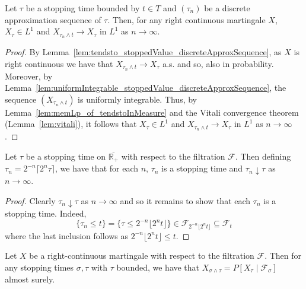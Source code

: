 \begin{lemma}\label{lem:tendsto_eLpNorm_stoppedValue_discreteApproxSequence}
  \leanok
  Let \(\tau\) be a stopping time bounded by \(t \in T\) and \((\tau_n)\) be a discrete approximation sequence of \(\tau\).
  Then, for any right continuous martingale \(X\), \(X_{\tau} \in L^1\) and \(X_{\tau_n \wedge t} \to X_{\tau}\) in \(L^1\) as \(n \to \infty\).
\end{lemma}

\begin{proof}
  \leanok
  By Lemma~\ref{lem:tendsto_stoppedValue_discreteApproxSequence}, as \(X\) is right continuous we have that \(X_{\tau_n \wedge t} \to X_{\tau}\) a.s. and so,
  also in probability. Moreover, by Lemma~\ref{lem:uniformIntegrable_stoppedValue_discreteApproxSequence}, the sequence \((X_{\tau_n \wedge t})\) is uniformly integrable.
  Thus, by Lemma~\ref{lem:memLp_of_tendstoInMeasure} and the Vitali convergence theorem (Lemma~\ref{lem:vitali}), it
  follows that \(X_{\tau} \in L^1\) and \(X_{\tau_n \wedge t} \to X_{\tau}\) in \(L^1\) as \(n \to \infty\).
\end{proof}

\begin{lemma}\label{lem:stoppingTime_approximation}
  Let $\tau$ be a stopping time on $\overline{\mathbb{R}_+}$ with respect to the filtration $\mathcal{F}$.
  Then defining $\tau_n =  2^{-n} \lceil 2^n \tau \rceil$,
  we have that for each $n$, $\tau_n$ is a stopping time and $\tau_n \downarrow \tau$ as $n \to \infty$.
\end{lemma}

\begin{proof}
  Clearly $\tau_n \downarrow \tau$ as $n \to \infty$ and so it remains to show that each $\tau_n$ is a stopping time.
  Indeed,
  \[\{\tau_n \le t\} = \{\tau \le 2^{-n} \lfloor 2^n t\rfloor\}
    \in \mathcal{F}_{2^{-n} \lfloor 2^n t\rfloor} \subseteq \mathcal{F}_t\]
  where the last inclusion follows as \(2^{-n} \lfloor 2^n t\rfloor \le t\).
\end{proof}

\begin{lemma}\label{lem:optionalSampling}
  Let $X$ be a right-continuous martingale with respect to the filtration $\mathcal{F}$. Then for
  any stopping times $\sigma, \tau$ with $\tau$ bounded, we have that
  $X_{\sigma \wedge \tau} = P[X_{\tau} \mid \mathcal{F}_{\sigma}]$ almost surely.
\end{lemma}

